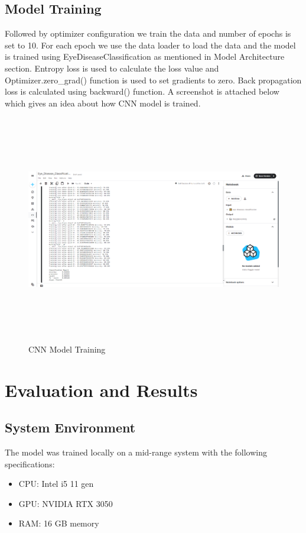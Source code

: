 \documentclass[conference]{IEEEtran}
\begin{document}
\subsection{Model Training}
Followed by optimizer configuration we train the data and number of epochs is set to 10. For each epoch we use the data loader to load the data and the model is trained using EyeDiseaseClassification as mentioned in Model Architecture section. Entropy loss is used to calculate the loss value and Optimizer.zero\_grad() function is used to set gradients to zero. Back propagation loss is calculated using backward() function. A screenshot is attached below which gives an idea about how CNN model is trained.

\begin{figure}[ht]
    \centering
    \includegraphics[width=\textwidth,height = 10cm]{Images/Kaggle Model Training.png}
    \caption{CNN Model Training}
    \label{CNN Model Training}
\end{figure}

\section{Evaluation and Results}
\subsection{System Environment}
The model was trained locally on a mid-range system with the following specifications:
\begin{itemize}
  \item CPU: Intel i5 11 gen
  \item GPU: NVIDIA RTX 3050
  \item RAM: 16 GB memory
\end{itemize}
\end{document}

